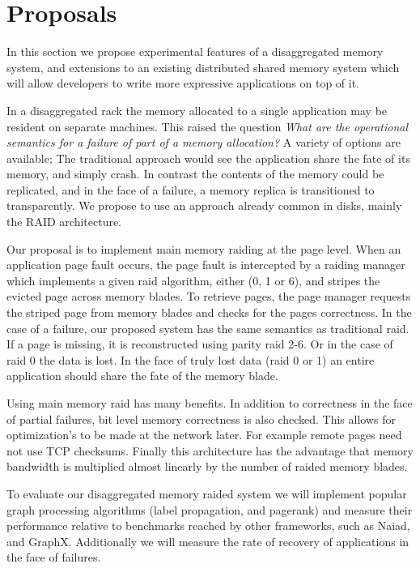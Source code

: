 \section{Proposals}
\label{sec:proposal}
In this section we propose experimental features of a disaggregated
memory system, and extensions to an existing distributed shared memory
system which will allow developers to write more expressive
applications on top of it.


 In a disaggregated
rack the memory allocated to a single application may be resident on
separate machines. This raised the question \emph{What are the operational
semantics for a failure of part of a memory allocation?} A variety of
options are available; The traditional approach would see the
application share the fate of its memory, and simply crash. In
contrast the contents of the memory could be replicated, and in the
face of a failure, a memory replica is transitioned to transparently.
We propose to use an approach already common in disks, mainly the RAID
architecture.

Our proposal is to implement main memory raiding at the page level.
When an application page fault occurs, the page fault is intercepted
by a raiding manager which implements a given raid algorithm, either
(0, 1 or 6), and stripes the evicted page across memory blades. To
retrieve pages, the page manager requests the striped page from memory
blades and checks for the pages correctness. In the case of a failure,
our proposed system has the same semantics as traditional raid. If a
page is missing, it is reconstructed using parity raid 2-6. Or in the
case of raid 0 the data is lost. In the face of truly lost data (raid
0 or 1) an entire application should share the fate of the memory
blade.

Using main memory raid has many benefits.  In addition to correctness
in the face of partial failures, bit level memory correctness is also
checked.  This allows for optimization's to be made at the network
later. For example remote pages need not use TCP checksums. Finally
this architecture has the advantage that memory bandwidth is
multiplied almost linearly by the number of raided memory blades.

To evaluate our disaggregated memory raided system we will implement
popular graph processing algorithms (label propagation, and pagerank)
and measure their performance relative to benchmarks reached by other
frameworks, such as Naiad, and GraphX. Additionally we will measure
the rate of recovery of applications in the face of failures. 

